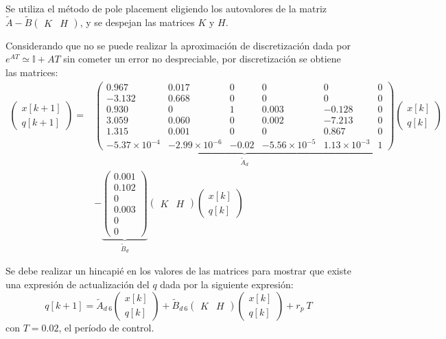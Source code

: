 \documentclass[a4paper,10pt]{article}
\begin{document}
Se utiliza el método de pole placement eligiendo los autovalores de la matriz $\tilde{A} - \tilde{B} \begin{pmatrix} K & H \end{pmatrix}$, y se despejan las matrices $K$ y $H$.

Considerando que no se puede realizar la aproximación de discretización dada por $e^{A T} \simeq \mathbb{I} + A T$ sin cometer un error no despreciable, por discretización se obtiene las matrices: 
\begin{align*}
    \begin{pmatrix} x[k + 1] \\ q[k + 1] \end{pmatrix} =&
    \underbrace{\begin{pmatrix}
         0.967 & 0.017 & 0 & 0     &  0     & 0 \\
        -3.132 & 0.668 & 0 & 0     &  0     & 0 \\
         0.930 & 0     & 1 & 0.003 & -0.128 & 0 \\
         3.059 & 0.060 & 0 & 0.002 & -7.213 & 0 \\
         1.315 & 0.001 & 0 & 0     &  0.867 & 0 \\
         -5.37 \times 10^{-4} & -2.99 \times 10^{-6} & -0.02 & -5.56 \times 10^{-5} & 1.13 \times 10^{-3} & 1
    \end{pmatrix}}_{\tilde{A}_d}
    \begin{pmatrix} x[k] \\ q[k] \end{pmatrix} \\
     &- \underbrace{\begin{pmatrix}  
        0.001 \\ 0.102 \\ 0 \\ 0.003 \\ 0 \\ 0 
    \end{pmatrix}}_{\tilde{B}_d}
    \begin{pmatrix} K & H \end{pmatrix} 
    \begin{pmatrix} x[k] \\ q[k] \end{pmatrix}
\end{align*}

Se debe realizar un hincapié en los valores de las matrices para mostrar que existe una expresión de actualización del $q$ dada por la siguiente expresión:
\begin{equation*}
    q[k + 1]= \tilde{A}_{d~6} 
    \begin{pmatrix} x[k] \\ q[k] \end{pmatrix}
    + \tilde{B}_{d~6} 
    \begin{pmatrix} K & H \end{pmatrix} 
    \begin{pmatrix} x[k] \\ q[k] \end{pmatrix} + r_p ~ T
\end{equation*}
con $T = 0.02$, el período de control. 
\end{document}
